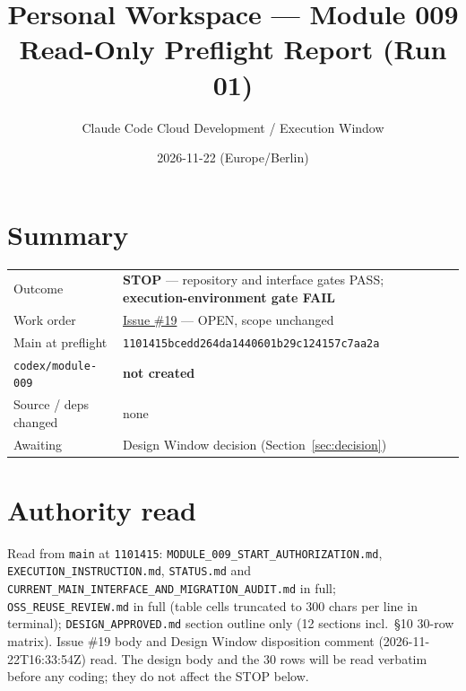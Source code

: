 \documentclass[11pt,a4paper]{article}
\title{Personal Workspace --- Module 009\\Read-Only Preflight Report (Run 01)}
\author{Claude Code Cloud Development / Execution Window}
\date{2026-11-22 (Europe/Berlin)}
\newcommand{\sha}[1]{\texttt{\small #1}}
\newcommand{\STOP}{\textcolor{red!70!black}{\textbf{STOP}}}
\begin{document}
\maketitle

\section*{Summary}
\begin{tabularx}{\textwidth}{@{}lX@{}}
\toprule
Outcome & \STOP{} --- repository and interface gates PASS; \textbf{execution-environment gate FAIL} \\
Work order & \href{https://github.com/zyyu1/personal-workspace/issues/19}{Issue \#19} --- OPEN, scope unchanged \\
Main at preflight & \sha{1101415bcedd264da1440601b29c124157c7aa2a} \\
\texttt{codex/module-009} & \textbf{not created} \\
Source / deps changed & none \\
Awaiting & Design Window decision (Section~\ref{sec:decision}) \\
\bottomrule
\end{tabularx}

\section{Authority read}
Read from \texttt{main} at \sha{1101415}: \texttt{MODULE\_009\_START\_AUTHORIZATION.md}, \texttt{EXECUTION\_INSTRUCTION.md}, \texttt{STATUS.md} and \texttt{CURRENT\_MAIN\_INTERFACE\_AND\_MIGRATION\_AUDIT.md} in full; \texttt{OSS\_REUSE\_REVIEW.md} in full (table cells truncated to 300 chars per line in terminal); \texttt{DESIGN\_APPROVED.md} section outline only (12 sections incl.\ \S10 30-row matrix). Issue \#19 body and Design Window disposition comment (2026-11-22T16:33:54Z) read. The design body and the 30 rows will be read verbatim before any coding; they do not affect the STOP below.
\end{document}
